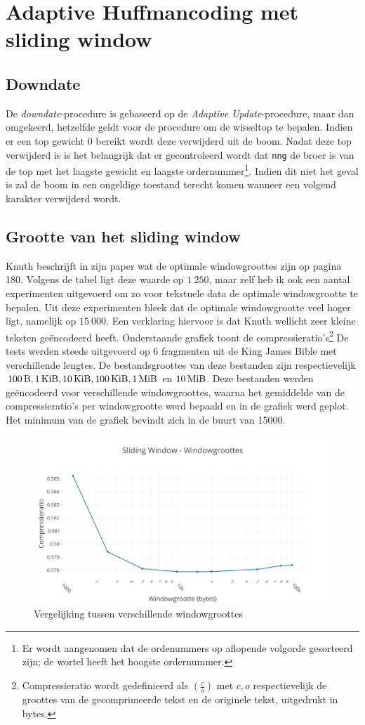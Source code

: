 \section{Adaptive Huffmancoding met sliding window}

\subsection{Downdate}
De \emph{downdate}-procedure is gebaseerd op de \emph{Adaptive Update}-procedure, maar dan omgekeerd, hetzelfde geldt voor de procedure om de wisseltop te bepalen. Indien er een top gewicht $0$ bereikt wordt deze verwijderd uit de boom. Nadat deze top verwijderd is is het belangrijk dat er gecontroleerd wordt dat \texttt{nng} de broer is van de top met het laagste gewicht en laagste ordernummer\footnote{Er wordt aangenomen dat de ordenummers op aflopende volgorde gesorteerd zijn; de wortel heeft het hoogste ordernummer.}. Indien dit niet het geval is zal de boom in een ongeldige toestand terecht komen wanneer een volgend karakter verwijderd wordt. 

\subsection{Grootte van het sliding window}
Knuth beschrijft in zijn paper \cite{knuthhuffman} wat de optimale windowgroottes zijn op pagina 180. Volgens de tabel ligt deze waarde op \texttt{$1\ 250$}, maar zelf heb ik ook een aantal experimenten uitgevoerd om zo voor tekstuele data de optimale windowgrootte te bepalen. Uit deze experimenten bleek dat de optimale windowgrootte veel hoger ligt, namelijk op \texttt{$15\ 000$}. Een verklaring hiervoor is dat Knuth wellicht zeer kleine teksten ge\"encodeerd heeft. Onderstaande grafiek toont de compressieratio's\footnote{Compressieratio wordt gedefinieerd als $(\frac{c}{o})$ met $c,o$ respectievelijk de groottes van de gecomprimeerde tekst en de originele tekst, uitgedrukt in bytes.} De tests werden steeds uitgevoerd op 6 fragmenten uit de King James Bible \cite{gutenbergbible} met verschillende lengtes. De bestandsgroottes van deze bestanden zijn respectievelijk $\SI{100}{\byte}, \SI{1}{\kibi\byte}, \SI{10}{\kibi\byte}, \SI{100}{\kibi\byte}, \SI{1}{\mebi\byte}$ en $\SI{10}{\mebi\byte}$. Deze bestanden werden ge\"encodeerd voor verschillende windowgroottes, waarna het gemiddelde van de compressieratio's per windowgrootte werd bepaald en in de grafiek werd geplot. Het minimum van de grafiek bevindt zich in de buurt van \SI{15000}{\byte}.

\begin{figure}[h]
	\centering
	\includegraphics[width=0.9\linewidth]{resources/sliding-window.png}
	\caption{Vergelijking tussen verschillende windowgroottes}
\end{figure}